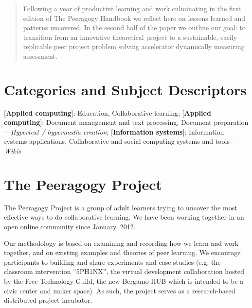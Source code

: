 \documentclass{acm_proc_article-sp}
\begin{document}

\maketitle
\begin{abstract}

Following a year of productive learning and work culminating in the first edition of The Peeragogy Handbook we reflect here on lessons learned and patterns uncovered. In the second half of the paper we outline our goal: to transition from an innovative theoretical project to a sustainable, easily replicable peer project problem solving accelerator dynamically measuring assessment.

\end{abstract}

%
%
%
%

\section*{Categories and Subject Descriptors}
[{\bf Applied computing}]: {Education}, {Collaborative learning};
[{\bf Applied computing}]: {Document management and text processing}, {Document preparation}---\emph{Hypertext / hypermedia creation};
[{\bf Information systems}]: {Information systems applications}, {Collaborative and social computing systems and tools}---\emph{Wikis}



\section{The Peeragogy Project}

The Peeragogy Project is a group of adult learners trying to uncover
the most effective ways to do collaborative learning.  We have been
working together in an open online community since January, 2012.  

Our methodology is based on examining and recording how we learn and
work together, and on existing examples and theories of peer learning.
We encourage participants to building and share experiments and case
studies (e.g. the classroom intervention ``5PH1NX'', the virtual
development collaboration hosted by the Free Technology Guild, the new
Bergamo HUB which is intended to be a civic center and maker space).
As such, the project serves as a research-based distributed project
incubator.
\end{document}
